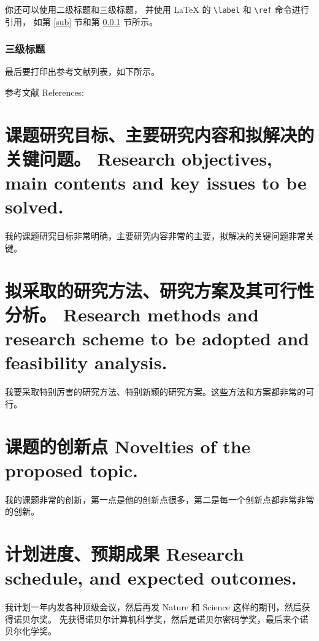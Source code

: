 \documentclass[a4paper,zihao=-4,AutoFakeBold]{ctexart}
\begin{document}
你还可以使用二级标题和三级标题，
并使用 \LaTeX{} 的 \verb|\label| 和 \verb|\ref| 命令进行引用，
如第 \ref{sub} 节和第 \ref{subsub} 节所示。



\subsubsection{三级标题}\label{subsub}

最后要打印出参考文献列表，如下所示。


\vspace{2\baselineskip}%
{%
    \linespread{1.25}\selectfont    %
    参考文献 References: 
    \printbibliography[heading=none]
}


\section{课题研究目标、主要研究内容和拟解决的关键问题。 
    Research objectives, main contents and key issues to be solved.}

我的课题研究目标非常明确，主要研究内容非常的主要，拟解决的关键问题非常关键。



\section{拟采取的研究方法、研究方案及其可行性分析。
    Research methods and research scheme to be adopted 
    and feasibility analysis.}

我要采取特别厉害的研究方法、特别新颖的研究方案。这些方法和方案都非常的可行。



\section{课题的创新点 Novelties of the proposed topic.}

我的课题非常的创新，第一点是他的创新点很多，第二是每一个创新点都非常非常的创新。



\section{计划进度、预期成果 Research schedule, and expected outcomes.}

我计划一年内发各种顶级会议，然后再发 Nature 和 Science 这样的期刊，然后获得诺贝尔奖。
先获得诺贝尔计算机科学奖，然后是诺贝尔密码学奖，最后来个诺贝尔化学奖。
\end{document}
